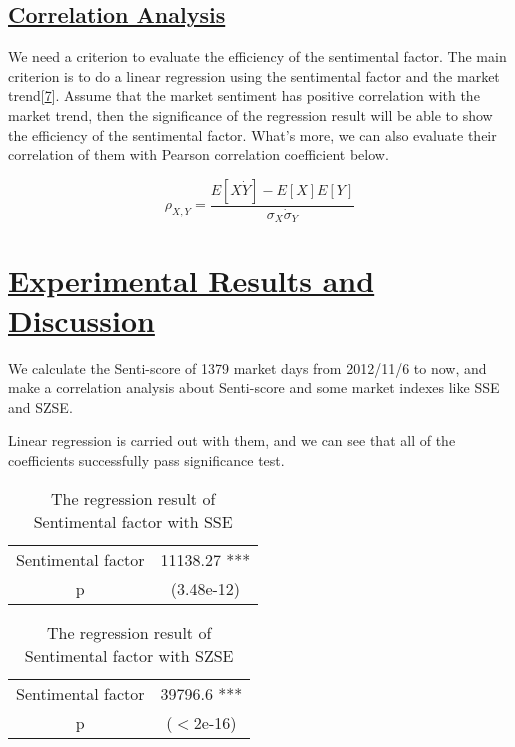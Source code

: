 \documentclass[10pt, conference, compsocconf]{IEEEtran}
\begin{document}
\subsection{\underline{Correlation Analysis}}
We need a criterion to evaluate the efficiency of the sentimental factor. The main criterion is to do a linear regression using the sentimental factor and the market trend[\hyperref[ref 7]{7}]. Assume that the market sentiment has positive correlation with the market trend, then the significance of the regression result will be able to show the efficiency of the sentimental factor. What's more, we can also evaluate their correlation of them with Pearson correlation coefficient below.

\begin{equation}
\rho_{X,Y} = \frac{E[X\dot Y]-E[X]E[Y]}{\sigma_{X}\dot \sigma_{Y}}
\end{equation}

\vspace{0.5cm}

\section{\underline{Experimental Results and Discussion}}

We calculate the Senti-score of 1379 market days from 2012/11/6 to now, and make a correlation analysis about Senti-score and some market indexes like SSE and SZSE.

Linear regression is carried out with them, and we can see that all of the coefficients successfully pass significance test.

\begin{table}[h]
\caption{The regression result of Sentimental factor with SSE}
\centering
\begin{tabular}{c|c}
\hline
{Sentimental factor} & 11138.27 ***\\
{p} & (3.48e-12) \\
\hline
\end{tabular}
\end{table}

\begin{table}[h]
\caption{The regression result of Sentimental factor with SZSE}
\centering
\begin{tabular}{c|c}
\hline
{Sentimental factor} & 39796.6 ***\\
{p} & ($<$2e-16) \\
\hline
\end{tabular}
\end{table}
\end{document}
